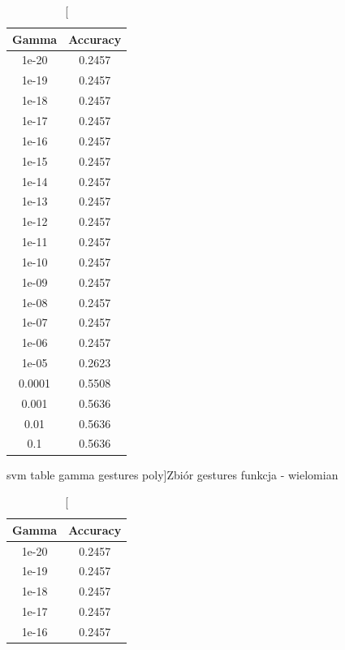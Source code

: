 \documentclass{classrep}
\begin{document}
{{\begin{table}[!htbp]
\begin{minipage}{.3\textwidth}
        \label{svm_table_c_gestures_sigmoid}
    \end{minipage}
\end{table}
\FloatBarrier
\begin{table}[!htbp]
    \begin{minipage}{.35\textwidth}
        \centering
        \begin{tabular}{|c|c|}
            \hline
			Gamma & Accuracy \\ \hline
			1e-20 & 0.2457 \\ \hline
1e-19 & 0.2457 \\ \hline
1e-18 & 0.2457 \\ \hline
1e-17 & 0.2457 \\ \hline
1e-16 & 0.2457 \\ \hline
1e-15 & 0.2457 \\ \hline
1e-14 & 0.2457 \\ \hline
1e-13 & 0.2457 \\ \hline
1e-12 & 0.2457 \\ \hline
1e-11 & 0.2457 \\ \hline
1e-10 & 0.2457 \\ \hline
1e-09 & 0.2457 \\ \hline
1e-08 & 0.2457 \\ \hline
1e-07 & 0.2457 \\ \hline
1e-06 & 0.2457 \\ \hline
1e-05 & 0.2623 \\ \hline
0.0001 & 0.5508 \\ \hline
0.001 & 0.5636 \\ \hline
0.01 & 0.5636 \\ \hline
0.1 & 0.5636 \\ \hline
        \end{tabular}
        \caption
        [svm table gamma  gestures  poly]{Zbiór gestures  funkcja - wielomian}
		\label{svn_table_gamma_gestures_poly}
    \end{minipage}
    \hfill
    \begin{minipage}{.3\textwidth}
        \centering
        \begin{tabular}{|c|c|}
            \hline
			Gamma & Accuracy \\ \hline
			1e-20 & 0.2457 \\ \hline
1e-19 & 0.2457 \\ \hline
1e-18 & 0.2457 \\ \hline
1e-17 & 0.2457 \\ \hline
1e-16 & 0.2457 \\ \hline

\end{tabular}
\end{minipage}
\end{table}}}
\end{document}
